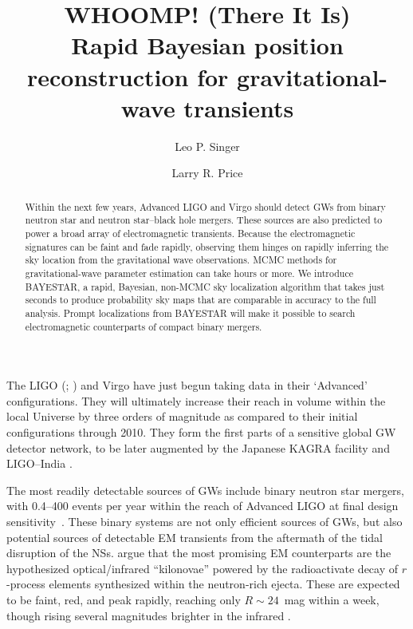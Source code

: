 \documentclass[amsmath,amssymb,aps,prx,reprint,nopreprintnumbers,nofootinbib,showpacs]{revtex4-1}
\begin{document}
\title[Rapid-response Bayesian sky localization]{WHOOMP! (There It Is) \\
Rapid Bayesian position reconstruction for gravitational\nobreakdashes-wave transients}
\author{Leo P. Singer}
\author{Larry R. Price}

\begin{abstract}
Within the next few years, Advanced LIGO and Virgo should detect \acp{GW} from binary neutron star and neutron star\nobreakdashes--black hole mergers. These sources are also predicted to power a broad array of electromagnetic transients. Because the electromagnetic signatures can be faint and fade rapidly, observing them hinges on rapidly inferring the sky location from the gravitational wave observations. \ac{MCMC} methods for gravitational\nobreakdashes-wave parameter estimation can take hours or more. We introduce BAYESTAR, a rapid, Bayesian, non-\ac{MCMC} sky localization algorithm that takes just seconds to produce probability sky maps that are comparable in accuracy to the full analysis. Prompt localizations from BAYESTAR will make it possible to search electromagnetic counterparts of compact binary mergers.
\end{abstract}

\maketitle

The \acl{LIGO} (; \cite{AdvancedLIGOHarry,AdvancedLIGO}) and Virgo \cite{AdvancedVirgo} have just begun taking data \cite{LIGOObservingScenarios} in their `Advanced' configurations. They will ultimately increase their reach in volume within the local Universe by three orders of magnitude as compared to their initial configurations through 2010. They form the first parts of a sensitive global \ac{GW} detector network, to be later augmented by the Japanese KAGRA facility \cite{LCGT,KAGRAInterferometerDesign} and \ac{LIGO}\nobreakdashes--India \cite{LIGOIndia}.

The most readily detectable sources of \acp{GW} include binary neutron star mergers, with 0.4\nobreakdashes--400 events per year within the reach of Advanced LIGO at final design sensitivity~\cite{rates}. These binary systems are not only efficient sources of \acp{GW}, but also potential sources of detectable \ac{EM} transients from the aftermath of the tidal disruption of the \acp{NS}. \citet{MostPromisingEMCounterpart} argue that the most promising \ac{EM} counterparts are the hypothesized optical/infrared ``kilonovae'' powered by the radioactivate decay of $r$\nobreakdashes-process elements synthesized within the neutron\nobreakdashes-rich ejecta. These are expected to be faint, red, and peak rapidly, reaching only $R \sim 24$~mag within a week, though rising several magnitudes brighter in the infrared \citep{KilonovaHighOpacities}.
\end{document}
